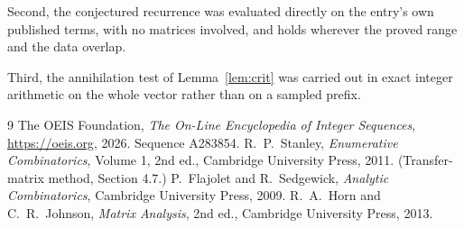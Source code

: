 \documentclass[11pt,a4paper]{article}
\theoremstyle{plain}
\theoremstyle{definition}
\begin{document}
Second, the conjectured recurrence was evaluated directly on the entry's own published terms,
with no matrices involved, and holds wherever the proved range and the data overlap.

Third, the annihilation test of Lemma~\ref{lem:crit} was carried out in exact integer
arithmetic on the whole vector rather than on a sampled prefix.

\begin{thebibliography}{9}
 The OEIS Foundation, \emph{The On-Line Encyclopedia of Integer
Sequences}, \url{https://oeis.org}, 2026. Sequence A283854.
 R.~P.~Stanley, \emph{Enumerative Combinatorics}, Volume 1, 2nd ed.,
Cambridge University Press, 2011. (Transfer-matrix method, Section 4.7.)
 P.~Flajolet and R.~Sedgewick, \emph{Analytic Combinatorics}, Cambridge
University Press, 2009.
 R.~A.~Horn and C.~R.~Johnson, \emph{Matrix Analysis}, 2nd ed., Cambridge
University Press, 2013.
\end{thebibliography}
\end{document}
